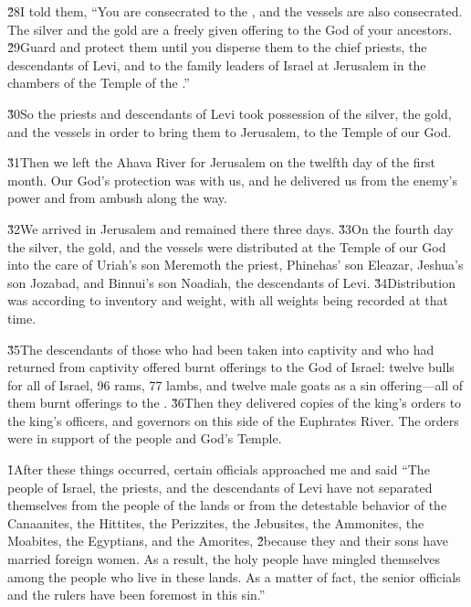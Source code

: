 \v{28}I told them, ``You are consecrated to the , and the vessels are also consecrated. The silver and the gold are a freely given offering to the  God of your ancestors. \v{29}Guard and protect them until you disperse them to the chief priests, the descendants of Levi, and to the family leaders of Israel at Jerusalem in the chambers of the Temple of the .''

\v{30}So the priests and descendants of Levi took possession of the silver, the gold, and the vessels in order to bring them to Jerusalem, to the Temple of our God.

\v{31}Then we left the Ahava River for Jerusalem on the twelfth day of the first month. Our God's protection was with us, and he delivered us from the enemy's power and from ambush along the way.

\v{32}We arrived in Jerusalem and remained there three days. \v{33}On the fourth day the silver, the gold, and the vessels were distributed at the Temple of our God into the care of Uriah's son Meremoth the priest, Phinehas' son Eleazar, Jeshua's son Jozabad, and Binnui's son Noadiah, the descendants of Levi. \v{34}Distribution was according to inventory and weight, with all weights being recorded at that time.

\v{35}The descendants of those who had been taken into captivity and who had returned from captivity offered burnt offerings to the God of Israel: twelve bulls for all of Israel, 96 rams, 77 lambs, and twelve male goats as a sin offering---all of them burnt offerings to the . \v{36}Then they delivered copies of the king's orders to the king's officers, and governors on this side of the Euphrates River. The orders were in support of the people and God's Temple.

\v{1}After these things occurred, certain officials approached me and said ``The people of Israel, the priests, and the descendants of Levi have not separated themselves from the people of the lands or from the detestable behavior of the Canaanites, the Hittites, the Perizzites, the Jebusites, the Ammonites, the Moabites, the Egyptians, and the Amorites, \v{2}because they and their sons have married foreign women. As a result, the holy people have mingled themselves among the people who live in these lands. As a matter of fact, the senior officials and the rulers have been foremost in this sin.''

